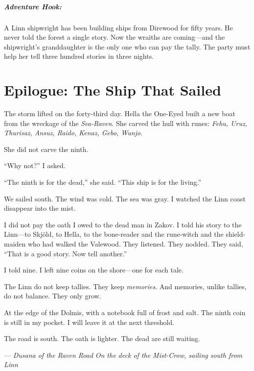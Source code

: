 \documentclass[9pt,a5paper]{extbook}
\begin{document}
\paragraph{Adventure Hook:}
A Linn shipwright has been building ships from Direwood for fifty years. He never told the forest a single story. Now the wraiths are coming---and the shipwright's granddaughter is the only one who can pay the tally. The party must help her tell three hundred stories in three nights.

\clearpage

\chapter*{Epilogue: The Ship That Sailed}

The storm lifted on the forty-third day. Hella the One-Eyed built a new boat from the wreckage of the \textit{Sea-Raven}. She carved the hull with runes: \textit{Fehu, Uruz, Thurisaz, Ansuz, Raido, Kenaz, Gebo, Wunjo}.

She did not carve the ninth.

``Why not?'' I asked.

``The ninth is for the dead,'' she said. ``This ship is for the living.''

We sailed south. The wind was cold. The sea was gray. I watched the Linn coast disappear into the mist.

I did not pay the oath I owed to the dead man in Zakov. I told his story to the Linn---to Skjöld, to Hella, to the bone-reader and the rune-witch and the shield-maiden who had walked the Valewood. They listened. They nodded. They said, ``That is a good story. Now tell another.''

I told nine. I left nine coins on the shore---one for each tale.

The Linn do not keep tallies. They keep \textit{memories}. And memories, unlike tallies, do not balance. They only grow.

At the edge of the Dolmis, with a notebook full of frost and salt. The ninth coin is still in my pocket. I will leave it at the next threshold.

The road is south. The oath is lighter. The dead are still waiting.

\hfill --- \textit{Dusana of the Raven Road}
\vspace{0.5cm}
\hfill \textit{On the deck of the \textit{Mist-Crow}, sailing south from Linn}

\clearpage
\end{document}

